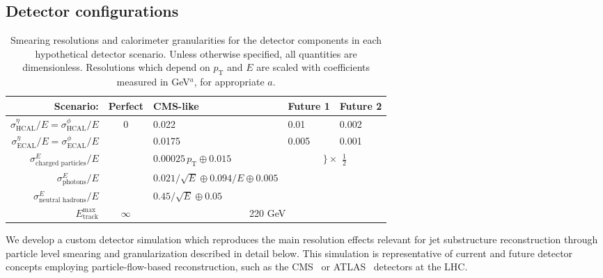 \documentclass[11pt,letterpaper]{article}
\newcommand{\pt}{p_{\mathrm{T}}}
\begin{document}
\subsection{Detector configurations}
\label{sec:detectors}


\begin{table}[t]
   \centering
   \begin{tabular}{|r|c|l|l|l|}\hline
   \textbf{Scenario:}& \textbf{Perfect} & \textbf{CMS-like} & \textbf{Future 1} & \textbf{Future 2}  \\\hline
   \hline
   $\sigma_{\text{HCAL}}^{\eta}/E=\sigma_{\text{HCAL}}^{\phi}/E$ & \multirow{5}{*}{0} & 0.022  & 0.01 & 0.002 \\\cline{1-1}\cline{3-5}
   $\sigma_{\text{ECAL}}^{\eta}/E=\sigma_{\text{ECAL}}^{\phi}/E$ & & 0.0175 & 0.005 & 0.001 \\\cline{1-1}\cline{3-5}
   $\sigma_{\text{charged particles}}^{E}/E$ & & $0.00025\, \pt \oplus 0.015$ & \multicolumn{2}{c|}{\multirow{3}{*}{$\Bigg\}\times \,\,\frac{1}{2}$}} \\ \cline{1-1}
   $\sigma_{\text{photons}}^{E}/E$ & & $0.021/\sqrt{E} \oplus 0.094/E \oplus 0.005$ & \multicolumn{2}{c|}{} \\\cline{1-1}
   $\sigma_{\text{neutral hadrons}}^{E}/E$ & & $0.45/\sqrt{E} \oplus 0.05$ & \multicolumn{2}{c|}{}\\\hline
   $E_{\text{track}}^{\text{max}}$ & $\infty$ & \multicolumn{3}{c|}{220 GeV} \\\hline
   \end{tabular}
   \caption{Smearing resolutions and calorimeter granularities for the detector components in each hypothetical detector scenario. Unless otherwise specified, all quantities are dimensionless. Resolutions which depend on $\pt$ and $E$ are scaled with coefficients measured in GeV$^a$, for appropriate $a$. }
   \label{tab:scenarios}
\end{table}

We develop a custom detector simulation which reproduces the main resolution effects relevant for jet substructure reconstruction
through particle level smearing and granularization described in detail below.  
%
This simulation is representative of current and future detector concepts employing particle-flow-based reconstruction, such as the CMS~\cite{Sirunyan:2017ulk} or ATLAS~\cite{Aaboud:2017aca} detectors at the LHC.
\end{document}
